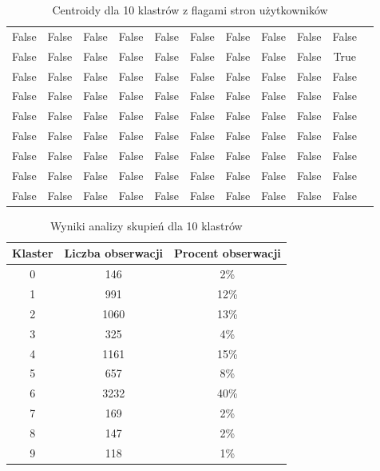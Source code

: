 \documentclass[../EDI_Task3_Karwowski_Kowalewski.tex]{subfiles}
\begin{document}
{{\begin{table}[!htbp]
\begin{tabular}{|c|c|c|c|c|c|c|c|c|c|c|}
                False   &   False   &   False   &   False   &   False   &   False   &   False   &   False   &   False   &   False \\
                False   &   False   &   False   &   False   &   False   &   False   &   False   &   False   &   False   &    True \\
                False   &   False   &   False   &   False   &   False   &   False   &   False   &   False   &   False   &   False \\
                False   &   False   &   False   &   False   &   False   &   False   &   False   &   False   &   False   &   False \\
                False   &   False   &   False   &   False   &   False   &   False   &   False   &   False   &   False   &   False \\
                False   &   False   &   False   &   False   &   False   &   False   &   False   &   False   &   False   &   False \\
                False   &   False   &   False   &   False   &   False   &   False   &   False   &   False   &   False   &   False \\
                False   &   False   &   False   &   False   &   False   &   False   &   False   &   False   &   False   &   False \\
                False   &   False   &   False   &   False   &   False   &   False   &   False   &   False   &   False   &   False \\ \hline
            \end{tabular}
            \caption{Centroidy dla 10 klastrów z flagami stron użytkowników}
        \end{table}

        \begin{table}[!htbp]
            \small
            \centering
            \begin{tabular}{|c|c|c|}
                \hline
                Klaster & Liczba obserwacji & Procent obserwacji \\ \hline
                0 & 146 & 2\% \\
                1 & 991 & 12\% \\
                2 & 1060 & 13\% \\
                3 & 325 & 4\% \\
                4 & 1161 & 15\% \\
                5 & 657 & 8\% \\
                6 & 3232 & 40\% \\
                7 & 169 & 2\% \\
                8 & 147 & 2\% \\
                9 & 118 & 1\% \\ \hline
            \end{tabular}
            \caption{Wyniki analizy skupień dla 10 klastrów}
        \end{table}

}}
\end{document}
